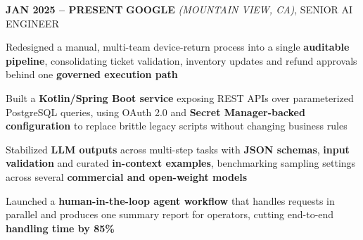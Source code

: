     \begin{twocolentry}{
        \textbf{JAN 2025 -- PRESENT}
        }
        \textbf{GOOGLE} \textit{(MOUNTAIN VIEW, CA)}, SENIOR AI ENGINEER
    \end{twocolentry}
    \begin{onecolentry}
        \vspace{0.05 cm}
        \begin{highlights}
            \item Redesigned a manual, multi-team device-return process into a single \textbf{auditable pipeline}, consolidating ticket validation, inventory updates and refund approvals behind one \textbf{governed execution path}
            \item Built a \textbf{Kotlin/Spring Boot service} exposing REST APIs over parameterized PostgreSQL queries, using OAuth 2.0 and \textbf{Secret Manager-backed configuration} to replace brittle legacy scripts without changing business rules
            \item Stabilized \textbf{LLM outputs} across multi-step tasks with \textbf{JSON schemas}, \textbf{input validation} and curated \textbf{in-context examples}, benchmarking sampling settings across several \textbf{commercial and open-weight models}
            \item Launched a \textbf{human-in-the-loop agent workflow} that handles requests in parallel and produces one summary report for operators, cutting end-to-end \textbf{handling time by 85\%}
        \end{highlights}
    \end{onecolentry}
    \vspace{0.2 cm}

